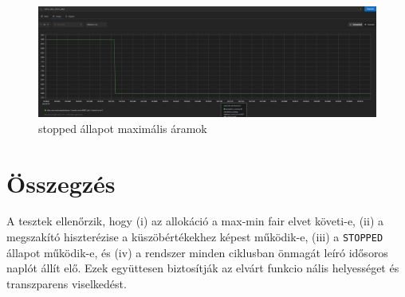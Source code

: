 \begin{figure}[H]
    \centering
    \includegraphics[width=1\textwidth]{figures/stop_6_3.png}
    \caption{stopped állapot maximális áramok}
    \label{fig:stop_3}
\end{figure}

\section*{Összegzés}
A tesztek ellenőrzik, hogy (i) az allokáció a max-min fair elvet követi-e, (ii) 
a megszakító hiszterézise a küszöbértékekhez képest működik-e, (iii) a \texttt{STOPPED}
állapot működik-e, és (iv) a rendszer minden ciklusban önmagát leíró idősoros naplót állít elő.
Ezek együttesen biztosítják az elvárt funkcio nális helyességet és transzparens viselkedést.
